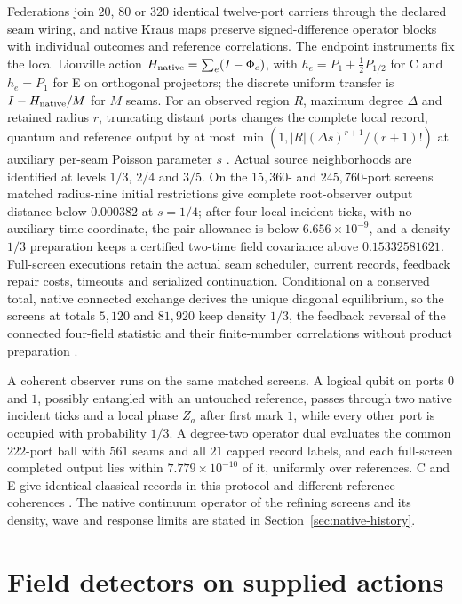 \documentclass[11pt]{article}
\theoremstyle{definition}
\theoremstyle{remark}
\theoremstyle{plain}
\begin{document}
Federations join $20$, $80$ or $320$ identical twelve-port carriers through
the declared seam wiring, and native Kraus maps preserve
signed-difference operator blocks with individual outcomes and reference
correlations. The endpoint instruments fix the local Liouville action
$H_{\rm native}=\sum_e(I-\Phi_e)$, with $h_e=P_1+\tfrac12P_{1/2}$ for C and
$h_e=P_1$ for E on orthogonal projectors; the discrete uniform transfer is
$I-H_{\rm native}/M$ for $M$ seams. For an observed region $R$, maximum
degree $\Delta$ and retained radius $r$, truncating distant ports changes
the complete local record, quantum and reference output by at most
$\min(1,|R|(\Delta s)^{r+1}/(r+1)!)$ at auxiliary per-seam Poisson parameter
$s$ \cite{nativeAction}. Actual source neighborhoods are identified at levels
$1/3$, $2/4$ and $3/5$. On the $15{,}360$- and $245{,}760$-port screens
matched radius-nine initial restrictions give complete root-observer
output distance below $0.000382$ at $s=1/4$; after four local incident
ticks, with no auxiliary time coordinate, the pair allowance is below
$6.656\times10^{-9}$, and a density-$1/3$ preparation keeps a certified
two-time field covariance above $0.15332581621$. Full-screen executions
retain the actual seam scheduler, current records, feedback repair costs,
timeouts and serialized continuation. Conditional on a conserved total,
native connected exchange derives the unique diagonal equilibrium, so the
screens at totals $5{,}120$ and $81{,}920$ keep density $1/3$, the feedback
reversal of the connected four-field statistic and their finite-number
correlations without product preparation \cite{nativeTimeFields}.

A coherent observer runs on the same matched screens. A logical qubit on
ports $0$ and $1$, possibly entangled with an untouched reference, passes
through two native incident ticks and a local phase $Z_a$ after first mark
$1$, while every other port is occupied with probability $1/3$. A
degree-two operator dual evaluates the common $222$-port ball with $561$
seams and all $21$ capped record labels, and each full-screen completed
output lies within $7.779\times10^{-10}$ of it, uniformly over references.
C and E give identical classical records in this protocol and different
reference coherences \cite{nativeScreenObserver}. The native continuum
operator of the refining screens and its density, wave and response limits
are stated in Section~\ref{sec:native-history}.

\section{Field detectors on supplied actions}
\label{sec:fields}
\end{document}
